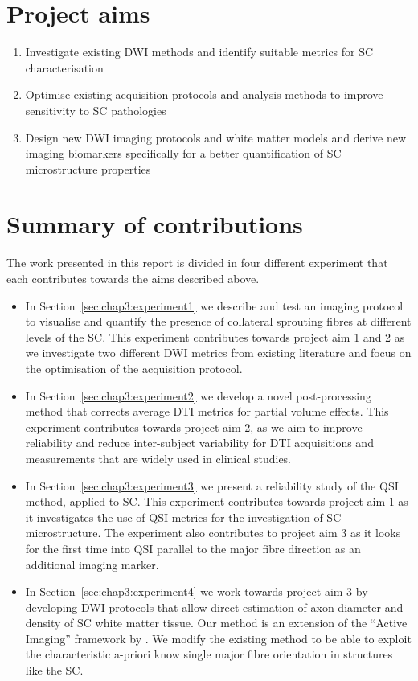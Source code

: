 \section{Project aims}
\begin{enumerate}
  \item Investigate existing \gls{DWI} methods and identify suitable metrics for \gls{SC} characterisation
  \item Optimise existing acquisition protocols and analysis methods to improve sensitivity to \gls{SC} pathologies
  \item Design new \gls{DWI} imaging protocols and white matter models and derive new imaging biomarkers specifically for a better quantification of \gls{SC} microstructure properties
\end{enumerate}

\section{Summary of contributions}
The work presented in this report is divided in four different experiment that each contributes towards the aims described above.
\begin{itemize}
  \item In Section~\ref{sec:chap3:experiment1} we describe and test an imaging protocol to visualise and quantify the presence of collateral sprouting fibres at different levels of the \gls{SC}. This experiment contributes towards project aim 1 and 2 as we investigate two different \gls{DWI} metrics from existing literature and focus on the optimisation of the acquisition protocol.
  \item In Section~\ref{sec:chap3:experiment2} we develop a novel post-processing method that corrects average \gls{DTI} metrics for partial volume effects. This experiment contributes towards project aim 2, as we aim to improve reliability and reduce inter-subject variability for \gls{DTI} acquisitions and measurements that are widely used in clinical studies.
  \item In Section~\ref{sec:chap3:experiment3} we present a reliability study of the \gls{QSI} method, applied to \gls{SC}. This experiment contributes towards project aim 1  as it investigates the use of \gls{QSI} metrics for the investigation of \gls{SC} microstructure. The experiment also contributes to project aim 3 as it looks for the first time into \gls{QSI} parallel to the major fibre direction as an additional imaging marker.
  \item In Section~\ref{sec:chap3:experiment4} we work towards project aim 3 by developing \gls{DWI} protocols that allow direct estimation of axon diameter and density of SC white matter tissue. Our method is an extension of the ``Active Imaging'' framework by \citet{Alexander:2010}. We modify the existing method to be able to exploit the characteristic a-priori know single major fibre orientation in structures like the \gls{SC}. 
\end{itemize}
